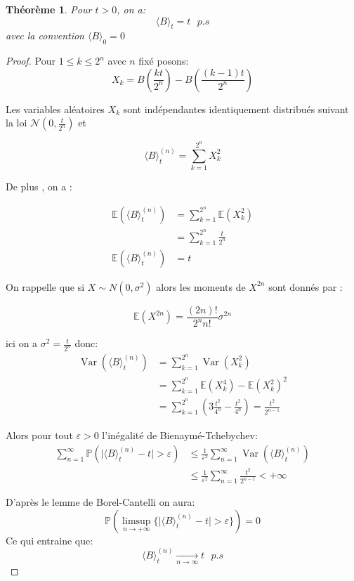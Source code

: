\documentclass[A4paper,12pt]{report}
\newtheorem{theorem}{Th\'eor\`eme}[chapter]
\newcommand{\pr}{{\mathbb{P}}}
\begin{document}
\begin{theorem}\label{thm2} Pour $t>0$, on a:
$$\langle B\rangle_{t}=t \text{  } p . s$$
avec la convention $\langle B\rangle_{0}=0$ 
\end{theorem}
\begin{proof}
Pour $1 \leq k \leq 2^{n}$ avec $n$ fixé posons:
$$X_{k}=B\left(\frac{k t}{2^{n}}\right)-B\left(\frac{(k-1) t}{2^{n}}\right) $$

Les variables aléatoires $X_{k}$ sont indépendantes identiquement distribués suivant la loi $\mathcal{N} (0, \frac{t}{2^{n}})$ et

$$
\langle B\rangle_{t}^{(n)}=\sum_{k=1}^{2^{n}} X_{k}^{2}
$$

De plus , on a :

$$
\begin{aligned}
\mathbb{E}\left(\langle B\rangle_{t}^{(n)}\right) & =\sum_{k=1}^{2^{n}} \mathbb{E}\left(X_{k}^{2}\right) \\
& =\sum_{k=1}^{2^{n}} \frac{t}{2^{n}} \\
\mathbb{E}\left(\langle B\rangle_{t}^{(n)}\right) & =t
\end{aligned}
$$

On rappelle que si $X \sim N\left(0, \sigma^{2}\right)$ alors les moments de $X^{2n}$ sont donnés par :

$$
\mathbb{E}\left(X^{2 n}\right)=\frac{(2 n) !}{2^{n} n !} \sigma^{2 n}
$$

ici on a $\sigma^{2}=\frac{t}{2^{n}}$ donc:
$$
\begin{aligned}
\operatorname{Var}\left(\langle B\rangle_{t}^{(n)}\right) & =\sum_{k=1}^{2^{n}} \operatorname{Var}\left(X_{k}^{2}\right) \\
& =\sum_{k=1}^{2^{n}} \mathbb{E}\left(X_{k}^{4}\right)-\mathbb{E}\left(X_{k}^{2}\right)^{2} \\
& =\sum_{k=1}^{2^{n}}\left(3 \frac{t^{2}}{4^{n}}-\frac{t^{2}}{4^{n}}\right)=\frac{t^{2}}{2^{n-1}}
\end{aligned}
$$

Alors pour tout $\varepsilon>0$ l'inégalité de Bienaymé-Tchebychev:
$$
\begin{aligned}
\sum_{n=1}^{\infty} \mathbb{P}\left(\lvert \langle B\rangle_{t}^{(n)}-t\rvert >\varepsilon\right) & \leq \frac{1}{\varepsilon^{2}} \sum_{n=1}^{\infty} \operatorname{Var}\left(\langle B\rangle_{t}^{(n)}\right) \\
& \leq \frac{1}{\varepsilon^{2}} \sum_{n=1}^{\infty} \frac{t^{2}}{2^{n-1}}< +\infty
\end{aligned}
$$

D'après le lemme de Borel-Cantelli on aura:
$$\pr (\limsup_{n \rightarrow +\infty} \{ \lvert \langle B\rangle_{t}^{(n)} - t\rvert > \varepsilon\} )=0$$
Ce qui entraine que:
$$
\langle B\rangle_{t}^{(n)} \underset{n \longrightarrow \infty}{\longrightarrow} t \text{  } p . s
$$

\end{proof} 
\end{document}
